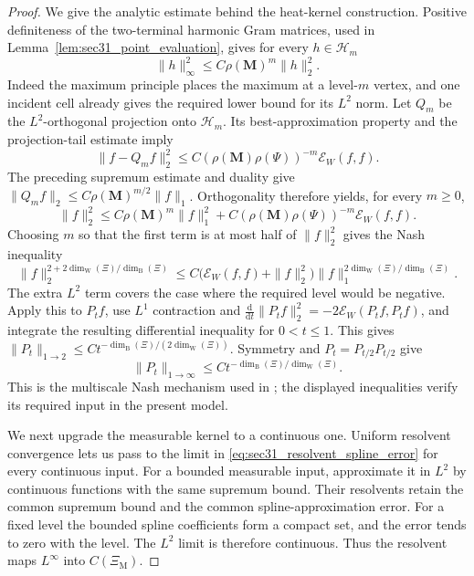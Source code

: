 \documentclass{article}
\theoremstyle{plain}
\theoremstyle{definition}
\newcommand{\dimbox}{\dim_\mathrm{B}}
\newcommand{\dimwalk}{\dim_\mathrm{W}}
\begin{document}
\begingroup\color{red}
\begin{proof}
We give the analytic estimate behind the heat-kernel construction.
Positive definiteness of the two-terminal harmonic Gram matrices, used
in Lemma~\ref{lem:sec31_point_evaluation}, gives for every $h\in\mathcal H_m$
\[
\|h\|_\infty^2\le C\rho(\mathbf M)^m\|h\|_2^2.
\]
Indeed the maximum principle places the maximum at a level-$m$ vertex,
and one incident cell already gives the required lower bound for its
$L^2$ norm. Let $Q_m$ be the $L^2$-orthogonal projection onto $\mathcal H_m$.
Its best-approximation property and the projection-tail estimate imply
\[
\|f-Q_m f\|_2^2\le
C(\rho(\mathbf M)\rho(\Psi))^{-m}\mathcal E_W(f,f).
\]
The preceding supremum estimate and duality give
$\|Q_m f\|_2\le C\rho(\mathbf M)^{m/2}\|f\|_1$.
Orthogonality therefore yields, for every $m\ge0$,
\begin{equation}\label{eq:sec33_multiscale_nash}
\|f\|_2^2\le C\rho(\mathbf M)^m\|f\|_1^2
 +C(\rho(\mathbf M)\rho(\Psi))^{-m}\mathcal E_W(f,f).
\end{equation}
Choosing $m$ so that the first term is at most half of $\|f\|_2^2$
gives the Nash inequality
\[
\|f\|_2^{2+2\dimwalk(\Xi)/\dimbox(\Xi)}
\le C\bigl(\mathcal E_W(f,f)+\|f\|_2^2\bigr)
\|f\|_1^{2\dimwalk(\Xi)/\dimbox(\Xi)}.
\]
The extra $L^2$ term covers the case where the required level would be
negative. Apply this to $P_t f$, use $L^1$ contraction and
$\frac{\mathrm d}{\mathrm dt}\|P_t f\|_2^2=-2\mathcal E_W(P_t f,P_t f)$,
and integrate the resulting differential inequality for $0<t\le1$.
This gives $\|P_t\|_{1\to2}\le Ct^{-\dimbox(\Xi)/(2\dimwalk(\Xi))}$.
Symmetry and $P_t=P_{t/2}P_{t/2}$ give
\[
\|P_t\|_{1\to\infty}\le Ct^{-\dimbox(\Xi)/\dimwalk(\Xi)}.
\]
This is the multiscale Nash mechanism used in
\cite{hambly1999transition,hambly2010diffusion}; the displayed inequalities
verify its required input in the present model.

We next upgrade the measurable kernel to a continuous one.
Uniform resolvent convergence lets us pass to the limit in
\eqref{eq:sec31_resolvent_spline_error} for every continuous input.
For a bounded measurable input, approximate it in $L^2$ by continuous
functions with the same supremum bound. Their resolvents retain the
common supremum bound and the common spline-approximation error.
For a fixed level the bounded spline
coefficients form a compact set, and the error tends to zero with the
level. The $L^2$ limit is therefore continuous. Thus the resolvent maps
$L^\infty$ into $C(\Xi_{\mathrm M})$.


\end{proof}
\end{document}
